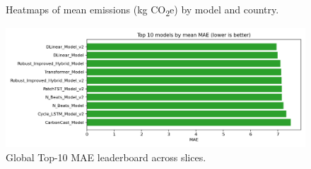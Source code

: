 \documentclass[10pt,conference]{IEEEtran}
\begin{document}
\begin{figure}[t]
  \centering
  \hfill
  \caption{Heatmaps of mean emissions (kg CO\textsubscript{2}e) by model and country.}
  \label{fig:heatmaps_emissions}
\end{figure}

\begin{figure}[t]
  \centering
  \includegraphics[width=0.95\linewidth]{../Results/Benchmark/top10_mae.png}
  \caption{Global Top-10 MAE leaderboard across slices.}
  \label{fig:top10_mae}
\end{figure}
\end{document}
